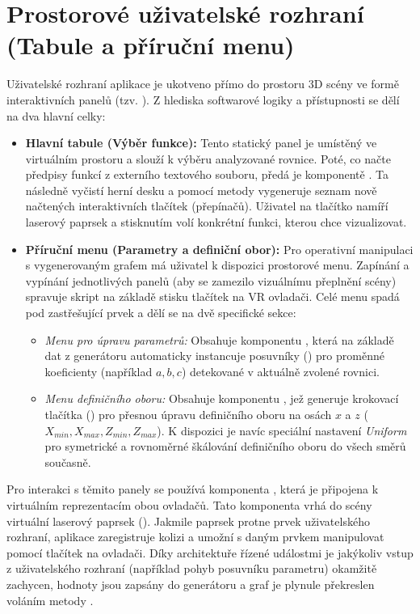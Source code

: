 \documentclass[czech, kiv, sem, he, iso690alph, pdf,viewonly]{fasthesis}
\begin{document}
\section{Prostorové uživatelské rozhraní (Tabule a příruční menu)}
Uživatelské rozhraní aplikace je ukotveno přímo do prostoru 3D scény ve formě interaktivních panelů (tzv. ). Z hlediska softwarové logiky a přístupnosti se dělí na dva hlavní celky:

\begin{itemize}
    \item \textbf{Hlavní tabule (Výběr funkce):} Tento statický panel je umístěný ve virtuálním prostoru a slouží k výběru analyzované rovnice. 
    Poté, co  načte předpisy funkcí z externího textového souboru, předá je komponentě . 
    Ta následně vyčistí herní desku a pomocí metody  vygeneruje seznam nově načtených interaktivních tlačítek (přepínačů). 
    Uživatel na tlačítko namíří laserový paprsek a stisknutím volí konkrétní funkci, kterou chce vizualizovat.
    
    \item \textbf{Příruční menu (Parametry a definiční obor):} Pro operativní manipulaci s vygenerovaným grafem má uživatel k dispozici prostorové menu. 
    Zapínání a vypínání jednotlivých panelů (aby se zamezilo vizuálnímu přeplnění scény) spravuje skript  na základě stisku tlačítek na VR ovladači. 
    Celé menu spadá pod zastřešující prvek  a dělí se na dvě specifické sekce:
    \begin{itemize}
        \item \textit{Menu pro úpravu parametrů:} Obsahuje komponentu , která na základě dat z generátoru automaticky instancuje posuvníky () 
        pro proměnné koeficienty (například $a, b, c$) detekované v aktuálně zvolené rovnici.
        \item \textit{Menu definičního oboru:} Obsahuje komponentu , 
        jež generuje krokovací tlačítka () pro přesnou úpravu definičního oboru na osách $x$ a $z$ ($X_{min}, X_{max}, Z_{min}, Z_{max}$). 
        K dispozici je navíc speciální nastavení \textit{Uniform} pro symetrické a rovnoměrné škálování definičního oboru do všech směrů současně.
    \end{itemize}
\end{itemize}

Pro interakci s těmito panely se používá komponenta , která je připojena k virtuálním reprezentacím obou ovladačů. 
Tato komponenta vrhá do scény virtuální laserový paprsek (). 
Jakmile paprsek protne prvek uživatelského rozhraní, aplikace zaregistruje kolizi a umožní s daným prvkem manipulovat pomocí tlačítek na ovladači. 
Díky architektuře řízené událostmi je jakýkoliv vstup z uživatelského rozhraní (například pohyb posuvníku parametru) okamžitě zachycen, hodnoty jsou zapsány do generátoru a graf je plynule překreslen voláním metody 
.
\end{document}
